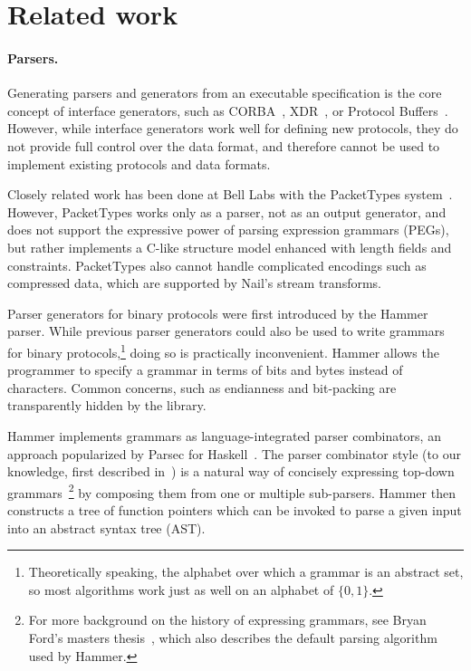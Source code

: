 \section{Related work}
\label{s:relwk}


\paragraph{Parsers.}

Generating parsers and generators from an executable specification is the
core concept of interface generators, such as CORBA~\cite{omg:corba},
XDR~\cite{rfc:1832}, or Protocol Buffers~\cite{varda2008}.  However,
while interface generators work well for defining new protocols, they
do not provide full control over the data format, and therefore cannot
be used to implement existing protocols and data formats.

Closely related work has been done at Bell Labs with the PacketTypes
system~\cite{mccann2000packet}.  However, PacketTypes works only as a
parser, not as an output generator, and does not support the expressive
power of parsing expression grammars (PEGs), but rather implements a
C-like structure model enhanced with length fields and constraints.
PacketTypes also cannot handle complicated encodings such as compressed
data, which are supported by Nail's stream transforms.

Parser generators for binary protocols were first introduced by the
Hammer~\cite{hammer-parser} parser.
While previous parser generators could also be used to write grammars
for binary protocols,\footnote{Theoretically speaking, the alphabet
over which a grammar is an abstract set, so most algorithms work
just as well on an alphabet of $\{0,1\}$.} doing so is practically
inconvenient. Hammer allows the programmer to specify a grammar in
terms of bits and bytes instead of characters. Common concerns, such as
endianness and bit-packing are transparently hidden by the library. 

Hammer implements grammars as language-integrated parser combinators, an approach popularized by
Parsec for Haskell~\cite{LeijenMeijer:parsec}. The parser combinator style (to our knowledge, first
described in~\cite{burge1975recursive}) is a natural way of concisely expressing top-down
grammars~\cite{Danielsson:2010:TPC:1863543.1863585}\footnote{For more background on the history of
  expressing grammars, see Bryan Ford's masters thesis~\cite{ford2002packrat}, which also describes
  the default parsing algorithm used by Hammer.} by composing them from one or multiple sub-parsers.
Hammer then constructs a tree of function pointers which can be invoked to parse a given input into
an abstract syntax tree (AST).

